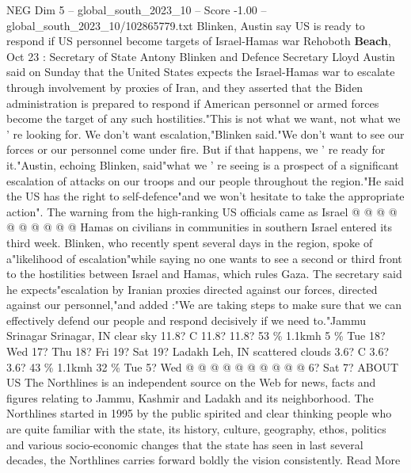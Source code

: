\begin{textsample}{NEG Dim 5 – global\_south\_2023\_10 – Score -1.00 – global\_south\_2023\_10/102865779.txt}  \label{ex:f5_neg_091}
Blinken, Austin say US is ready to respond if US personnel become targets of Israel-Hamas war Rehoboth \textbf{Beach}, Oct 23 : Secretary of State Antony Blinken and Defence Secretary Lloyd Austin said on Sunday that the United States expects the Israel-Hamas war to escalate through involvement by proxies of Iran, and they asserted that the Biden administration is prepared to respond if American personnel or armed forces become the target of any such hostilities."This is not what we want, not what we ' re looking for.
We don't want escalation,"Blinken said."We don't want to see our forces or our personnel come under fire.
But if that happens, we ' re ready for it."Austin, echoing Blinken, said"what we ' re seeing is a prospect of a significant escalation of attacks on our troops and our people throughout the region."He said the US has the right to self-defence"and we won't hesitate to take the appropriate action".
The warning from the high-ranking US officials came as Israel @ @ @ @ @ @ @ @ @ @ Hamas on civilians in communities in southern Israel entered its third week.
Blinken, who recently spent several days in the region, spoke of a"likelihood of escalation"while saying no one wants to see a second or third front to the hostilities between Israel and Hamas, which rules Gaza.
The secretary said he expects"escalation by Iranian proxies directed against our forces, directed against our personnel,"and added :"We are taking steps to make sure that we can effectively defend our people and respond decisively if we need to."Jammu Srinagar Srinagar, IN clear sky 11.8?
C 11.8? 11.8? 53 \% 1.1kmh 5 \% Tue 18?
Wed 17?
Thu 18?
Fri 19?
Sat 19?
Ladakh Leh, IN scattered clouds 3.6?
C 3.6? 3.6? 43 \% 1.1kmh 32 \% Tue 5?
Wed @ @ @ @ @ @ @ @ @ @ 6?
Sat 7?
ABOUT US The Northlines is an independent source on the Web for news, facts and figures relating to Jammu, Kashmir and Ladakh and its neighborhood.
The Northlines started in 1995 by the public spirited and clear thinking people who are quite familiar with the state, its history, culture, geography, ethos, politics and various socio-economic changes that the state has seen in last several decades, the Northlines carries forward boldly the vision consistently.
Read More

\end{textsample}
